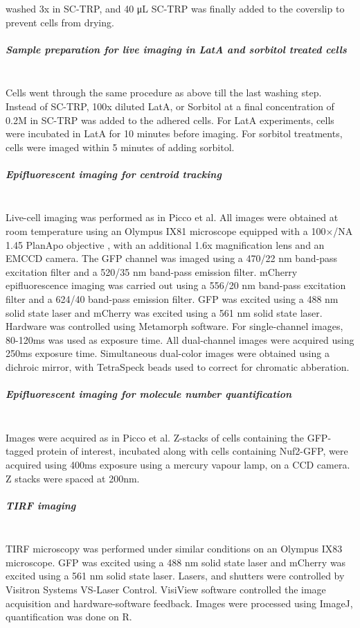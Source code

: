 washed 3x in SC-TRP, and 40 μL SC-TRP was finally added to the coverslip to prevent cells from drying. 

\subparagraph{Sample preparation for live imaging in LatA and sorbitol treated cells}
\mbox{}\\
Cells went through the same procedure as above till the last washing step. Instead of SC-TRP, 100x diluted LatA, or Sorbitol at a final concentration of 0.2M in SC-TRP was added to the adhered cells. For LatA experiments, cells were incubated in LatA for 10 minutes before imaging. For sorbitol treatments, cells were imaged within 5 minutes of adding sorbitol.

\subparagraph{Epifluorescent imaging for centroid tracking}
			\mbox{}\\
Live-cell imaging was performed as in Picco et al. All images were obtained at room temperature using an Olympus IX81 microscope equipped with a 100×/NA 1.45 PlanApo objective , with an additional 1.6x magnification lens and an EMCCD camera. The GFP channel was imaged using a 470/22 nm band-pass excitation filter and a 520/35 nm band-pass emission filter. mCherry epifluorescence imaging was carried out using a 556/20 nm band-pass excitation filter and a 624/40 band-pass emission filter. GFP was excited using a 488 nm solid state laser and mCherry was excited using a 561 nm solid state laser. Hardware was controlled using Metamorph software. For single-channel images, 80-120ms was used as exposure time. All dual-channel images were acquired using 250ms exposure time. Simultaneous dual-color images were obtained using a dichroic mirror, with TetraSpeck beads used to correct for chromatic abberation.

\subparagraph{Epifluorescent imaging for molecule number quantification}
			\mbox{}\\
Images were acquired as in Picco et al. Z-stacks of cells containing the GFP-tagged protein of interest, incubated along with cells containing Nuf2-GFP, were acquired using 400ms exposure using a mercury vapour lamp, on a CCD camera. Z stacks were spaced at 200nm. 

\subparagraph{TIRF imaging}
			\mbox{}\\
TIRF microscopy was performed under similar conditions on an Olympus IX83 microscope. GFP was excited using a 488 nm solid state laser and mCherry was excited using a 561 nm solid state laser. Lasers, and shutters were controlled by Visitron Systems VS-Laser Control. VisiView software controlled the image acquisition and hardware-software feedback.
Images were processed using ImageJ, quantification was done on R.

